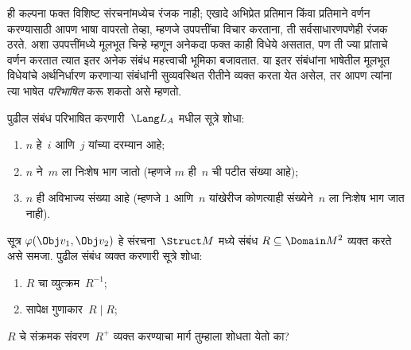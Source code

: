 \begin{explain}
ही कल्पना फक्त विशिष्ट संरचनांमध्येच रंजक नाही; एखादे अभिप्रेत
प्रतिमान किंवा प्रतिमाने वर्णन करण्यासाठी आपण भाषा वापरतो तेव्हा, म्हणजे
उपपत्तींचा विचार करताना, ती सर्वसाधारणपणेही रंजक ठरते. अशा उपपत्तींमध्ये
मूलभूत चिन्हे म्हणून अनेकदा फक्त काही विधेये असतात, पण ती ज्या
प्रांताचे वर्णन करतात त्यात इतर अनेक संबंध महत्त्वाची भूमिका बजावतात. या
इतर संबंधांना भाषेतील मूलभूत विधेयांचे अर्थनिर्धारण करणाऱ्या
संबंधांनी सुव्यवस्थित रीतीने व्यक्त करता येत असेल, तर आपण त्यांना त्या
भाषेत \emph{परिभाषित} करू शकतो असे म्हणतो.
\end{explain}

\begin{prob}
पुढील संबंध परिभाषित करणारी~$\Lang L_A$ मधील सूत्रे शोधा:
\begin{enumerate}
\item $n$ हे~$i$ आणि~$j$ यांच्या दरम्यान आहे;
\item $n$ ने~$m$ ला निःशेष भाग जातो (म्हणजे $m$ ही~$n$ ची पटीत संख्या आहे);
\item $n$ ही अविभाज्य संख्या आहे (म्हणजे $1$ आणि~$n$ यांखेरीज कोणत्याही
  संख्येने~$n$ ला निःशेष भाग जात नाही).
\end{enumerate}
\end{prob}

\begin{prob}
सूत्र $\varphi(\Obj v_1, \Obj v_2)$ हे संरचना~$\Struct M$ मध्ये संबंध
$R \subseteq \Domain M^2$ व्यक्त करते असे समजा. पुढील संबंध व्यक्त करणारी
सूत्रे शोधा:
\begin{enumerate}
\item $R$ चा व्युत्क्रम~$R^{-1}$;
\item सापेक्ष गुणाकार~$R \mid R$;
\end{enumerate}
$R$ चे संक्रमक संवरण~$R^+$ व्यक्त करण्याचा मार्ग तुम्हाला शोधता येतो का?
\end{prob}

